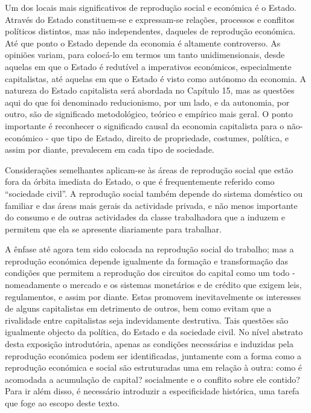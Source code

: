  \par 
Um dos locais mais significativos de reprodução social e económica é o Estado. Através do Estado constituem-se e expressam-se relações, processos e conflitos políticos distintos, mas não independentes, daqueles de reprodução económica. Até que ponto o Estado depende da economia é altamente controverso. As opiniões variam, para colocá-lo em termos um tanto unidimensionais, desde aquelas em que o Estado é redutível a imperativos económicos, especialmente capitalistas, até aquelas em que o Estado é visto como autónomo da economia. A natureza do Estado capitalista será abordada no Capítulo 15, mas as questões aqui do que foi denominado reducionismo, por um lado, e da autonomia, por outro, são de significado metodológico, teórico e empírico mais geral. O ponto importante é reconhecer o significado causal da economia capitalista para o não-económico - que tipo de Estado, direito de propriedade, costumes, política, e assim por diante, prevalecem em cada tipo de sociedade.
 \par 
Considerações semelhantes aplicam-se às áreas de reprodução social que estão fora da órbita imediata do Estado, o que é frequentemente referido como “sociedade civil”. A reprodução social também depende do sistema doméstico ou familiar e das áreas mais gerais da actividade privada, e não menos importante do consumo e de outras actividades da classe trabalhadora que a induzem e permitem que ela se apresente diariamente para trabalhar.
 \par 
A ênfase até agora tem sido colocada na reprodução social do trabalho; mas a reprodução económica depende igualmente da formação e transformação das condições que permitem a reprodução dos circuitos do capital como um todo - nomeadamente o mercado e os sistemas monetários e de crédito que exigem leis, regulamentos, e assim por diante. Estas promovem inevitavelmente os interesses de alguns capitalistas em detrimento de outros, bem como evitam que a rivalidade entre capitalistas seja indevidamente destrutiva. Tais questões são igualmente objecto da política, do Estado e da sociedade civil. No nível abstrato desta exposição introdutória, apenas as condições necessárias e induzidas pela reprodução económica podem ser identificadas, juntamente com a forma como a reprodução económica e social são estruturadas uma em relação à outra: como é acomodada a acumulação de capital? socialmente e o conflito sobre ele contido? Para ir além disso, é necessário introduzir a especificidade histórica, uma tarefa que foge ao escopo deste texto.
 \par 
